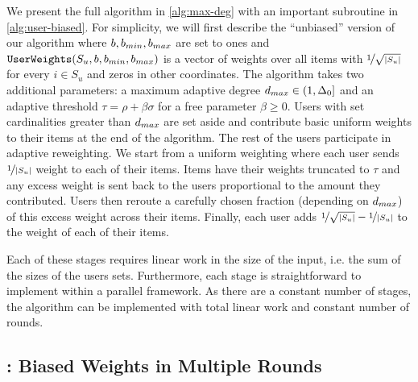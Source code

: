 We present the full algorithm in \cref{alg:max-deg} with an important subroutine in \cref{alg:user-biased}.
For simplicity, we will first describe the ``unbiased''  version of our algorithm where $b, b_{min}, b_{max}$ are set to ones and $\texttt{UserWeights}{}(S_u, b, b_{min}, b_{max})$ is a vector of weights over all items with $\nicefrac{1}{\sqrt{|S_u|}}$ for every $i \in S_u$ and zeros in other coordinates.
The algorithm takes two additional parameters: a maximum adaptive degree $d_{max} \in (1, \Delta_0]$ and an adaptive threshold $\tau = \rho + \beta \sigma$ for a free parameter $\beta \geq 0$. Users with set cardinalities greater than $d_{max}$ are set aside and contribute basic uniform weights to their items at the end of the algorithm. The rest of the users participate in adaptive reweighting. We start from a uniform weighting where each user sends $\nicefrac{1}{|S_u|}$ weight to each of their items. Items have their weights truncated to $\tau$ and any excess weight is sent back to the users proportional to the amount they contributed. Users then reroute a carefully chosen fraction (depending on $d_{max}$) of this excess weight across their items. Finally, each user adds $\nicefrac{1}{\sqrt{|S_u|}} - \nicefrac{1}{|S_u|}$ to the weight of each of their items. 

Each of these stages requires linear work in the size of the input, i.e. the sum of the sizes of the users sets.
Furthermore, each stage is straightforward to implement within a parallel framework. As there are a constant number of stages, the algorithm can be implemented with total linear work and constant number of rounds.

\subsection{\ouralgotworounds{}: Biased Weights in Multiple Rounds}

